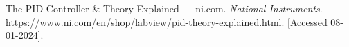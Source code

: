 \begin{thebibliography}{9}
    The {P}{I}{D} {C}ontroller \& {T}heory {E}xplained --- ni.com.
    \textit{National Instruments}.
    \url{https://www.ni.com/en/shop/labview/pid-theory-explained.html}.
    [Accessed 08-01-2024].
\end{thebibliography}
